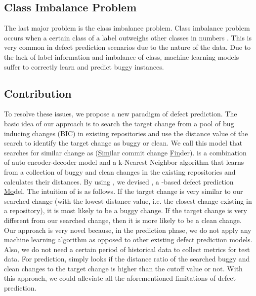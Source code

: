 \subsection{Class Imbalance Problem}
The last major problem is the class imbalance problem.
Class imbalance problem occurs when a certain class of a label outweighs other classes in numbers \cite{he2009learning}.
This is very common in defect prediction scenarios due to the nature of the data. 
Due to the lack of label information and imbalance of class, machine learning models suffer to correctly learn and predict buggy instances.

\subsection{Contribution}
To resolve these issues, we propose a new paradigm of defect prediction.
The basic idea of our approach is to search the target change from a pool of bug inducing changes (BIC) in existing repositories and use the distance value of the search to identify the target change as buggy or clean.
We call this model that searches for similar change as {\simfin} (\underline{Sim}ilar commit change \underline{Fin}der).
{\simfin} is a combination of auto encoder-decoder \cite{hinton2006reducing} model and a k-Nearest Neighbor algorithm \cite{duda1973pattern} that learns from a collection of buggy and clean changes in the existing repositories and calculates their distances.
By using {\simfin}, we devised {\simfinmo}, a \underline{\simfin}-based defect prediction \underline{Mo}del.
The intuition of {\simfin} is as follows.
If the target change is very similar to our searched change (with the lowest distance value, i.e. the closest change existing in a repository), it is most likely to be a buggy change.
If the target change is very different from our searched change, then it is more likely to be a clean change. Our approach is very novel because, in the prediction phase, we do not apply any machine learning algorithm as opposed to other existing defect prediction models.
Also, we do not need a certain period of historical data to collect metrics for test data.
For prediction, {\simfinmo} simply looks if the distance ratio of the searched buggy and clean changes to the target change is higher than the cutoff value or not.
With this approach, we could alleviate all the aforementioned limitations of defect prediction.

